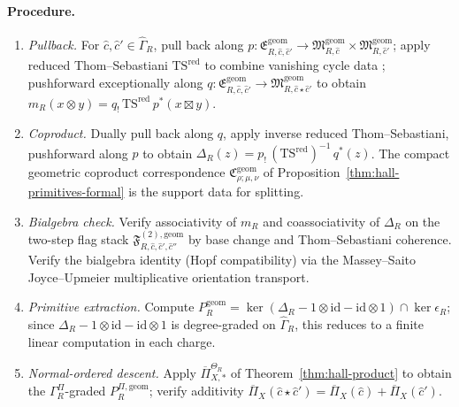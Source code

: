 \paragraph{Procedure.}
\begin{enumerate}
\item \emph{Pullback.}  For
\(\widehat c,\widehat c'\in\widehat\Gamma_R\), pull back along
\(p:\mathfrak E^{\mathrm{geom}}_{R,\widehat c,\widehat c'}
\to\mathfrak M^{\mathrm{geom}}_{R,\widehat c}
\times\mathfrak M^{\mathrm{geom}}_{R,\widehat c'}\); apply reduced
Thom--Sebastiani \(\mathrm{TS}^{\mathrm{red}}\) to combine vanishing
cycle data \cite{BBDJS2015}; pushforward exceptionally along
\(q:\mathfrak E^{\mathrm{geom}}_{R,\widehat c,\widehat c'}
\to\mathfrak M^{\mathrm{geom}}_{R,\widehat c\star\widehat c'}\) to
obtain
\(m_R(x\otimes y)=q_!\,\mathrm{TS}^{\mathrm{red}}\,p^*(x\boxtimes y)\).

\item \emph{Coproduct.}  Dually pull back along \(q\), apply
inverse reduced Thom--Sebastiani, pushforward along \(p\) to obtain
\(\Delta_R(z)=p_!\,(\mathrm{TS}^{\mathrm{red}})^{-1}\,q^*(z)\).
The compact geometric coproduct correspondence
\(\mathfrak C^{\mathrm{geom}}_{\rho;\mu,\nu}\) of
Proposition~\ref{thm:hall-primitives-formal} is the
support data for splitting.

\item \emph{Bialgebra check.}  Verify associativity of \(m_R\) and
coassociativity of \(\Delta_R\) on the two-step flag stack
\(\mathfrak F^{(2),\mathrm{geom}}_{R,\widehat c,\widehat c',\widehat c''}\)
by base change and Thom--Sebastiani coherence.  Verify the bialgebra
identity (Hopf compatibility) via the Massey--Saito Joyce--Upmeier
multiplicative orientation transport.

\item \emph{Primitive extraction.}  Compute
\(P_R^{\mathrm{geom}}=\ker(\Delta_R-1\otimes\mathrm{id}
-\mathrm{id}\otimes 1)\cap\ker\epsilon_R\); since
\(\Delta_R-1\otimes\mathrm{id}-\mathrm{id}\otimes 1\) is degree-graded
on \(\widehat\Gamma_R\), this reduces to a finite linear computation
in each charge.

\item \emph{Normal-ordered descent.}  Apply
\(\overline\Pi_{X,*}^{\Theta_R}\) of
Theorem~\ref{thm:hall-product} to obtain the
\(\Gamma_R^\Pi\)-graded
\(P_R^{\Pi,\mathrm{geom}}\); verify additivity
\(\overline\Pi_X(\widehat c\star\widehat c')
=\overline\Pi_X(\widehat c)+\overline\Pi_X(\widehat c')\).


\end{enumerate}
